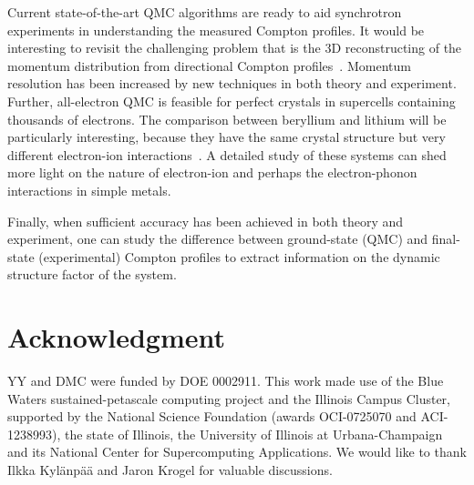 \documentclass[aps,prb,showpacs,preprintnumbers,amsmath,amssymb,superscriptaddress,twocolumn]{revtex4}
\begin{document}
Current state-of-the-art QMC algorithms are ready to aid synchrotron experiments in understanding the measured Compton profiles. It would be interesting to revisit the challenging problem that is the 3D reconstructing of the momentum distribution from directional Compton profiles~\cite{Schulke1996,Tanaka2001}. Momentum resolution has been increased by new techniques in both theory and experiment. Further, all-electron QMC is feasible for perfect crystals in supercells containing thousands of electrons. The comparison between beryllium and lithium will be particularly interesting, because they have the same crystal structure but very different electron-ion interactions~\cite{P.EisenbergerL.LamP.M.Platzman1972}. A detailed study of these systems can shed more light on the nature of electron-ion and perhaps the electron-phonon interactions in simple metals.

Finally, when sufficient accuracy has been achieved in both theory and experiment, one can study the difference between ground-state (QMC) and final-state (experimental) Compton profiles to extract information on the dynamic structure factor of the system.

\section{Acknowledgment}

YY and DMC were funded by DOE 0002911. This work made use of the Blue Waters sustained-petascale computing project and the Illinois Campus Cluster, supported by the National Science Foundation (awards OCI-0725070 and ACI-1238993), the state of Illinois, the University of Illinois at Urbana-Champaign and its National Center for Supercomputing Applications.
We would like to thank Ilkka Kyl\"anp\"a\"a and Jaron Krogel for valuable discussions.





\end{document}

